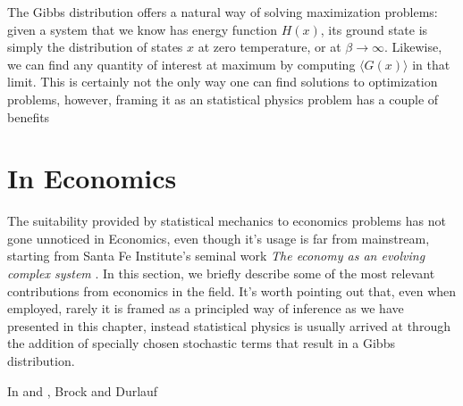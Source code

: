 The Gibbs distribution offers a natural way of solving maximization problems: given a system that we know has energy function $H(x)$, its ground state is simply the distribution of states $x$ at zero temperature, or at $\beta \to \infty$. Likewise, we can find any quantity of interest at maximum by computing $\langle G(x) \rangle$ in that limit. This is certainly not the only way one can find solutions to optimization problems, however, framing it as an statistical physics problem has a couple of benefits


\section{In Economics}

The suitability provided by statistical mechanics to economics problems has not gone unnoticed in Economics, even though it's usage is far from mainstream, starting from Santa Fe Institute's seminal work \textit{The economy as an evolving complex system} \cite{Anderson88, Arthur97}. In this section, we briefly describe some of the most relevant contributions from economics in the field. It's worth pointing out that, even when employed, rarely it is framed as a principled way of inference as we have presented in this chapter, instead statistical physics is usually arrived at through the addition of specially chosen stochastic terms that result in a Gibbs distribution.

In \cite{BrockDurlauf00} and \cite{BrockDurlauf01}, Brock and Durlauf 